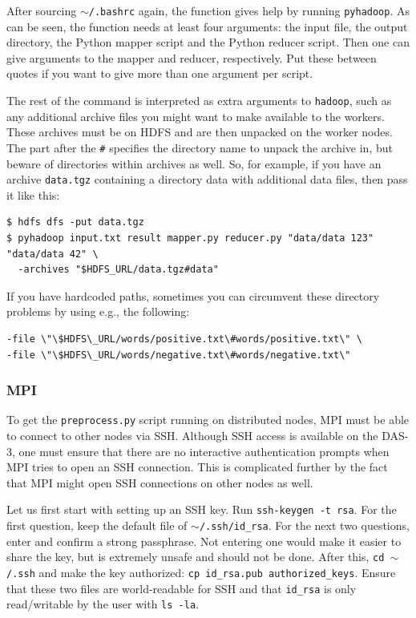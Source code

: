 \documentclass{article}
\begin{document}
After sourcing \texttt{$\sim$/.bashrc} again, the function gives help by 
running \texttt{pyhadoop}. As can be seen, the function needs at least four 
arguments: the input file, the output directory, the Python mapper script and 
the Python reducer script. Then one can give arguments to the mapper and 
reducer, respectively. Put these between quotes if you want to give more than 
one argument per script.

The rest of the command is interpreted as extra arguments to \texttt{hadoop}, 
such as any additional archive files you might want to make available to the 
workers. These archives must be on HDFS and are then unpacked on the worker 
nodes. The part after the \texttt{\#} specifies the directory name to unpack 
the archive in, but beware of directories within archives as well. So, for 
example, if you have an archive \texttt{data.tgz} containing a directory data 
with additional data files, then pass it like this:

\begin{verbatim}
$ hdfs dfs -put data.tgz
$ pyhadoop input.txt result mapper.py reducer.py "data/data 123" "data/data 42" \
  -archives "$HDFS_URL/data.tgz#data"
\end{verbatim}

If you have hardcoded paths, sometimes you can circumvent these directory 
problems by using e.g., the following:
\begin{verbatim}
-file \"\$HDFS\_URL/words/positive.txt\#words/positive.txt\" \
-file \"\$HDFS\_URL/words/negative.txt\#words/negative.txt\"
\end{verbatim}

\subsubsection{MPI}\label{app:mpi}
To get the \texttt{preprocess.py} script running on distributed nodes, MPI must 
be able to connect to other nodes via SSH\@. Although SSH access is available on
the DAS-3, one must ensure that there are no interactive authentication prompts
when MPI tries to open an SSH connection. This is complicated further by the fact
that MPI might open SSH connections on other nodes as well.

Let us first start with setting up an SSH key. Run \texttt{ssh-keygen -t rsa}. 
For the first question, keep the default file of \texttt{$\sim$/.ssh/id\_rsa}. 
For the next two questions, enter and confirm a strong passphrase. Not entering 
one would make it easier to share the key, but is extremely unsafe and should 
not be done. After this, \texttt{cd $\sim$/.ssh} and make the key authorized: 
\texttt{cp id\_rsa.pub authorized\_keys}. Ensure that these two files are 
world-readable for SSH and that \texttt{id\_rsa} is only read/writable by the 
user with \texttt{ls -la}.
\end{document}
